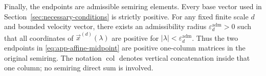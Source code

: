 \documentclass[aps,pra,11pt,onecolumn,nofootinbib,tightenlines]{revtex4-2}
\theoremstyle{definition}
\begin{document}
Finally, the endpoints are admissible semiring elements. Every base vector used in Section~\ref{sec:necessary-conditions} is strictly positive. For any fixed finite scale $d$ and bounded velocity vector, there exists an admissibility radius $\varepsilon_d^{\mathrm{adm}}>0$ such that all coordinates of $\vec x^{(d)}(\lambda)$ are positive for $|\lambda|<\varepsilon_d^{\mathrm{adm}}$. Thus the two endpoints in \eqref{eq:app-affine-midpoint} are positive one-column matrices in the original semiring. The notation $\operatorname{col}$ denotes vertical concatenation inside that one column; no semiring direct sum is involved.



\end{document}
